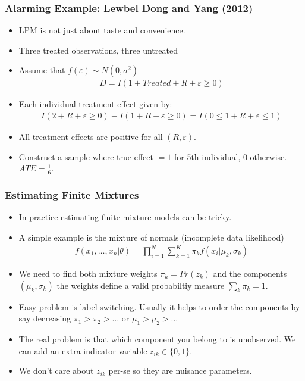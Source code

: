 \documentclass[aspectratio=169]{beamer}
\begin{document}
\begin{frame}
\frametitle{Alarming Example: Lewbel Dong and Yang (2012)}
\begin{itemize}
\item LPM is not just about taste and convenience.
\item Three treated observations, three untreated %
\item Assume that $f(\varepsilon) \sim N(0,\sigma^2)$
\begin{eqnarray*}
D = I ( 1 + Treated + R + \varepsilon \geq 0 ) 
\end{eqnarray*}
\item Each individual treatment effect given by:
\begin{eqnarray*}
 I ( 2 + R + \varepsilon \geq 0 ) -  I ( 1 + R + \varepsilon \geq 0 )  =  I ( 0 \leq 1 + R + \varepsilon \leq 1 ) 
\end{eqnarray*}
\item All treatment effects are positive for all $(R,\varepsilon)$.
\item Construct a sample where true effect $=1$ for 5th individual, 0 otherwise. $ATE= \frac{1}{6}$.
\end{itemize}
\end{frame}



\begin{frame}
\frametitle{Estimating Finite Mixtures}
\begin{itemize}
\item In practice estimating finite mixture models can be tricky.
\item A simple example is the mixture of normals (incomplete data likelihood)
\begin{eqnarray*}
f(x_1,\ldots,x_n | \theta) = \prod_{i=1}^N \sum_{k=1}^K \pi_k f(x_i | \mu_k, \sigma_k)
\end{eqnarray*}
\item We need to find both mixture weights $\pi_k = Pr(z_k)$ and the components $(\mu_k,\sigma_k)$ the weights define a valid probabiltiy measure $\sum_k \pi_k = 1$.
\item Easy problem is \alert{label switching}. Usually it helps to order the components by say decreasing $\pi_1 > \pi_2 > \ldots$ or  $\mu_1 > \mu_2 > \ldots$ 
\item The real problem is that which component you belong to is unobserved. We can add an extra indicator variable $z_{ik} \in \{0,1\}$.
\item We don't care about $z_{ik}$ per-se so they are \alert{nuisance parameters}.
\end{itemize}
\end{frame}
\end{document}
